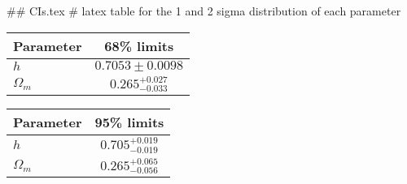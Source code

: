 ## CIs.tex
# latex table for the 1 and 2 sigma distribution of each parameter

\begin{tabular} { l  c}
 Parameter &  68\% limits\\
\hline
{\boldmath$h              $} & $0.7053\pm 0.0098          $\\
{\boldmath$\Omega_m       $} & $0.265^{+0.027}_{-0.033}   $\\
\hline
\end{tabular}

\begin{tabular} { l  c}
 Parameter &  95\% limits\\
\hline
{\boldmath$h              $} & $0.705^{+0.019}_{-0.019}   $\\
{\boldmath$\Omega_m       $} & $0.265^{+0.065}_{-0.056}   $\\
\hline
\end{tabular}
